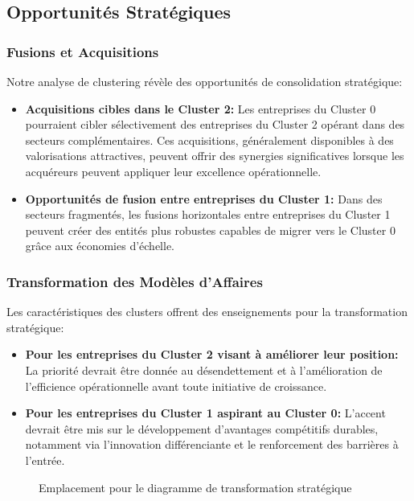 \documentclass[12pt]{article}
\begin{document}
\subsection{Opportunités Stratégiques}
\subsubsection{Fusions et Acquisitions}
Notre analyse de clustering révèle des opportunités de consolidation stratégique:

\begin{itemize}
    \item \textbf{Acquisitions cibles dans le Cluster 2:} Les entreprises du Cluster 0 pourraient cibler sélectivement des entreprises du Cluster 2 opérant dans des secteurs complémentaires. Ces acquisitions, généralement disponibles à des valorisations attractives, peuvent offrir des synergies significatives lorsque les acquéreurs peuvent appliquer leur excellence opérationnelle.
    
    \item \textbf{Opportunités de fusion entre entreprises du Cluster 1:} Dans des secteurs fragmentés, les fusions horizontales entre entreprises du Cluster 1 peuvent créer des entités plus robustes capables de migrer vers le Cluster 0 grâce aux économies d'échelle.
\end{itemize}

\subsubsection{Transformation des Modèles d'Affaires}
Les caractéristiques des clusters offrent des enseignements pour la transformation stratégique:

\begin{itemize}
    \item \textbf{Pour les entreprises du Cluster 2 visant à améliorer leur position:} La priorité devrait être donnée au désendettement et à l'amélioration de l'efficience opérationnelle avant toute initiative de croissance.
    
    \item \textbf{Pour les entreprises du Cluster 1 aspirant au Cluster 0:} L'accent devrait être mis sur le développement d'avantages compétitifs durables, notamment via l'innovation différenciante et le renforcement des barrières à l'entrée.
\end{itemize}

\begin{figure}[H]
    \centering
    \caption{Emplacement pour le diagramme de transformation stratégique}
    \label{fig:transformation}
\end{figure}
\end{document}
